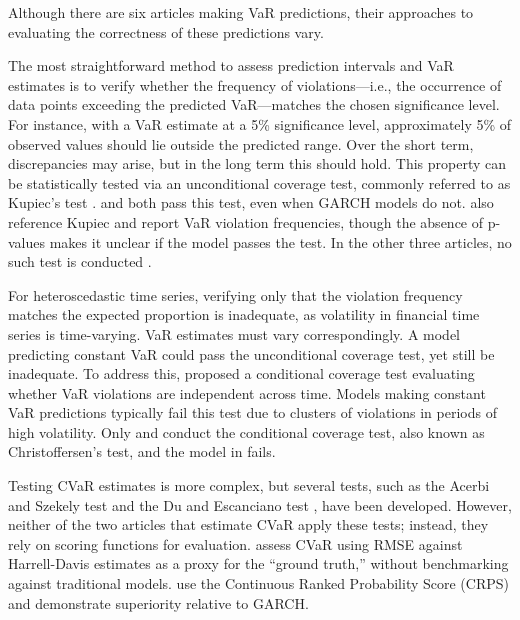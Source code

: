 Although there are six articles making VaR predictions, their approaches to evaluating the correctness of these predictions vary.

The most straightforward method to assess prediction intervals and VaR estimates is to verify whether the frequency of violations—i.e., the occurrence of data points exceeding the predicted VaR—matches the chosen significance level. For instance, with a VaR estimate at a 5\% significance level, approximately 5\% of observed values should lie outside the predicted range. Over the short term, discrepancies may arise, but in the long term this should hold. This property can be statistically tested via an unconditional coverage test, commonly referred to as Kupiec's test \parencite{kupiec1995techniques}. \textcite{Fatouros2023DeepVaR} and \textcite{arian2022encoded} both pass this test, even when GARCH models do not. \textcite{Horenko2020} also reference Kupiec and report VaR violation frequencies, though the absence of p-values makes it unclear if the model passes the test. In the other three articles, no such test is conducted \parencite{Almeida2024RiskForecasting, Risk2018gpr, caprioli2023quantifying}.

For heteroscedastic time series, verifying only that the violation frequency matches the expected proportion is inadequate, as volatility in financial time series is time-varying. VaR estimates must vary correspondingly. A model predicting constant VaR could pass the unconditional coverage test, yet still be inadequate. To address this, \textcite{Christoffersen1998} proposed a conditional coverage test evaluating whether VaR violations are independent across time. Models making constant VaR predictions typically fail this test due to clusters of violations in periods of high volatility. Only \textcite{Fatouros2023DeepVaR} and \textcite{arian2022encoded} conduct the conditional coverage test, also known as Christoffersen's test, and the model in \textcite{arian2022encoded} fails.

Testing CVaR estimates is more complex, but several tests, such as the Acerbi and Szekely \parencite{acerbi2014backtesting} test and the Du and Escanciano test \parencite{Du2017}, have been developed. However, neither of the two articles that estimate CVaR apply these tests; instead, they rely on scoring functions for evaluation. \textcite{Risk2018gpr} assess CVaR using RMSE against Harrell-Davis estimates as a proxy for the ``ground truth,'' without benchmarking against traditional models. \textcite{Almeida2024RiskForecasting} use the Continuous Ranked Probability Score (CRPS) and demonstrate superiority relative to GARCH.

